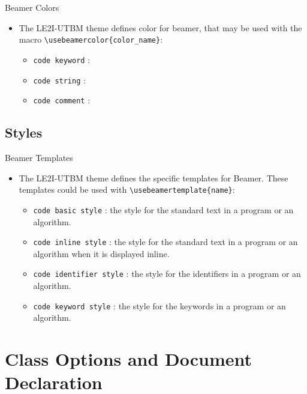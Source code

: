 \documentclass[english,sectioncirclenumberstyle]{le2iutbmbeamer}
\begin{document}
\begin{frame}{Beamer Colors}
	\begin{itemize}
	\item The LE2I-UTBM theme defines color for beamer, that may be used with the macro \texttt{{\textbackslash}usebeamercolor\{color\_name\}}:
		\begin{itemize}
		\item \texttt{code keyword} : 
		\vfill
		\item \texttt{code string} : 
		\vfill
		\item \texttt{code comment} : 
		\end{itemize}
	\end{itemize}
\end{frame}

\subsection{Styles}
\begin{frame}{Beamer Templates}
	\begin{itemize}
	\item The LE2I-UTBM theme defines the specific templates for Beamer. These templates could be used with 
		\texttt{{\textbackslash}usebeamertemplate\{name\}}:
		\begin{itemize}
		\item \texttt{code basic style} : the style for the standard text in a program or an algorithm. 
		\vfill
		\item \texttt{code inline style} : the style for the standard text in a program or an algorithm when it is displayed inline. 
		\vfill
		\item \texttt{code identifier style} : the style for the identifiers in a program or an algorithm. 
		\vfill
		\item \texttt{code keyword style} : the style for the keywords in a program or an algorithm. 
		\end{itemize}
	\end{itemize}
\end{frame}

\section{Class Options and Document Declaration}
\tableofcontentslide[sectionstyle={show/shaded},subsectionstyle={show/show/hide},subsubsectionstyle={hide/hide/hide/hide},sections={1-6}]
\end{document}
